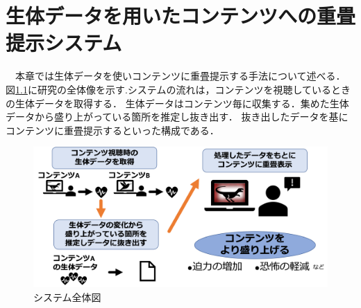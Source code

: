 \chapter{生体データを用いたコンテンツへの重畳提示システム}

\thispagestyle{myheadings}

　本章では生体データを使いコンテンツに重畳提示する手法について述べる．
図\ref{systemall}に研究の全体像を示す.システムの流れは，コンテンツを視聴しているときの生体データを取得する．
生体データはコンテンツ毎に収集する．集めた生体データから盛り上がっている箇所を推定し抜き出す．
抜き出したデータを基にコンテンツに重畳提示するといった構成である．

\begin{figure}[H]
    \centering
    \includegraphics[width=15cm]{images/chapter3/allsysytem.png}
    \caption{システム全体図}
    \label{systemall}
\end{figure}



